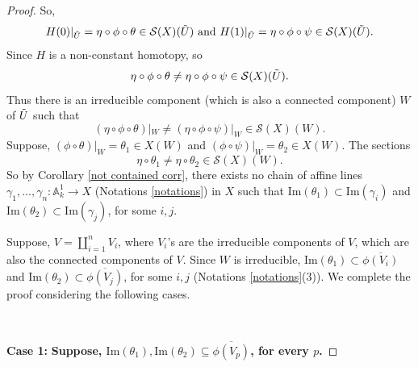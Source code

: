 \documentclass[11pt, reqno]{amsart}
\theoremstyle{plain}
\theoremstyle{definition}
\newcommand{\A}{{\mathbb A}}
\begin{document}
\begin{proof}
So,
$$H(0)|_{\Tilde{U}} =\eta \circ \phi \circ \theta \in \mathcal{S}(X)(\Tilde{U}) \text{ and } H(1)|_{\Tilde{U}} = \eta \circ \phi \circ \psi \in \mathcal{S}(X)(\Tilde{U}).$$
Since $H$ is a non-constant homotopy, so 
$$\eta \circ \phi \circ \theta \neq \eta \circ \phi \circ \psi \in \mathcal{S}(X)(\Tilde{U}).$$
Thus there is an irreducible component (which is also a connected component) $W$ of $\Tilde{U}$ such that 
$$(\eta \circ \phi \circ \theta)|_W \neq (\eta \circ \phi \circ \psi)|_W \in \mathcal{S}(X)(W).$$
Suppose, $(\phi \circ \theta)|_W = \theta_1 \in X(W)$ and $(\phi \circ \psi)|_W = \theta_2 \in X(W)$. The sections 
$$\eta \circ \theta_1 \neq \eta \circ \theta_2 \in \mathcal{S}(X)(W).$$
So by Corollary \ref{not contained corr}, there exists no chain of affine lines $\gamma_1, \dots, \gamma_n: \A^1_k \to X$ (Notations \ref{notations}) in $X$ such that $\text{Im}(\theta_1) \subset \text{Im}(\gamma_i)$ and $\text{Im}(\theta_2) \subset \text{Im}(\gamma_j)$, for some $i,j$.

Suppose, $V  = \coprod_{i =1}^n V_i$, where $V_i$'s are the irreducible components of $V$, which are also the connected components of $V$. Since $W$ is irreducible, $\text{Im}(\theta_1) \subset \overline{\phi(V_i)}$ and $\text{Im}(\theta_2) \subset \overline{\phi(V_j)}$, for some $i, j$ (Notations \ref{notations}(3)). 
We complete the proof considering the following cases.

\

\textbf{Case 1:} \textbf{Suppose, $\text{Im}(\theta_1), \text{Im}(\theta_2) \subseteq \overline{\phi(V_p)}$, for every $p$.}


\end{proof}
\end{document}
